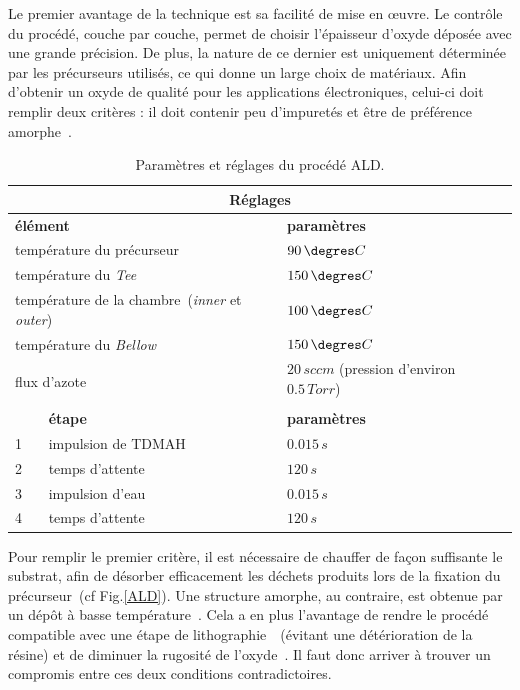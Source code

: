 Le premier avantage de la technique est sa facilité de mise en œuvre. Le contrôle du procédé, couche par couche, permet de choisir l'épaisseur d'oxyde déposée avec une grande précision. De plus, la nature de ce dernier est uniquement déterminée par les précurseurs utilisés, ce qui donne un large choix de matériaux. Afin d'obtenir un oxyde de qualité pour les applications électroniques, celui-ci doit remplir deux critères : il doit contenir peu d'impuretés et être de préférence amorphe~\cite{Kim2003}.

\begin{table}
\begin{center}
\begin{tabular}{|p{0.5cm}|p{6cm}|p{6cm}|}
\hline
\multicolumn{3}{|c|}{\textbf{Réglages}} \tabularnewline
\hline
\multicolumn{2}{|l|}{\textbf{élément}} & \textbf{paramètres} \tabularnewline
\hline
\multicolumn{2}{|l|}{température du précurseur} & $90\, \degres C$ \tabularnewline
\hline
\multicolumn{2}{|l|}{température du \textit{Tee}} & $150\, \degres C$ \tabularnewline
\hline
\multicolumn{2}{|l|}{température de la chambre~(\textit{inner} et \textit{outer})} & $100\, \degres C$ \tabularnewline
\hline
\multicolumn{2}{|l|}{température du \textit{Bellow}} & $150\, \degres C$ \tabularnewline
\hline
\multicolumn{2}{|l|}{\multirow{2}{*}{flux d'azote}} & $20\, sccm$ \newline (pression d'environ $0.5\,Torr$) \tabularnewline
\hline
\hline
\multicolumn{3}{|c|}{\textbf{Procédé}} \tabularnewline
\hline
\,& \textbf{étape} & \textbf{paramètres} \tabularnewline
\hline
1 & impulsion de TDMAH & $0.015\,s$ \tabularnewline
\hline
2 & temps d'attente & $120\,s$ \tabularnewline
\hline
3 & impulsion d'eau & $0.015\,s$ \tabularnewline
\hline
4 & temps d'attente & $120\,s$ \tabularnewline
\hline
\end{tabular}
\caption{Paramètres et réglages du procédé ALD.}
\label{recette_ALD}
\end{center}
\end{table}



Pour remplir le premier critère, il est nécessaire de chauffer de façon suffisante le substrat, afin de désorber efficacement les déchets produits lors de la fixation du précurseur~(cf Fig.\ref{ALD}). Une structure amorphe, au contraire, est obtenue par un dép\^ot à basse température~\cite{Triyoso2004}. Cela a en plus l'avantage de rendre le procédé compatible avec une étape de lithographie~\cite{Biercuk2003}~(évitant une détérioration de la résine) et de diminuer la rugosité de l'oxyde~\cite{Triyoso2004}. Il faut donc arriver à trouver un compromis entre ces deux conditions contradictoires.

